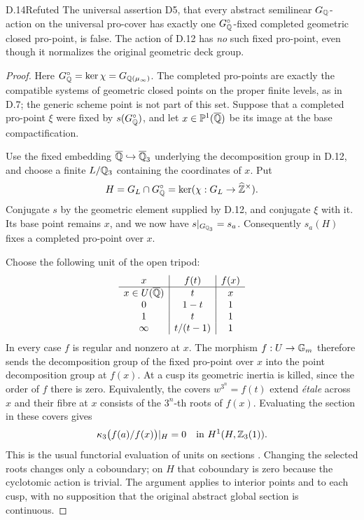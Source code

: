 \begin{claim}{D.14}{Refuted}
The universal assertion D5, that every abstract semilinear
$G_\mathbb Q$-action on the universal pro-cover has exactly one
$G_\mathbb Q^\circ$-fixed completed geometric closed pro-point,
is false. The action of D.12 has \emph{no} such fixed
pro-point, even though it normalizes the original geometric
deck group.
\end{claim}
\begin{proof}
Here $G_\mathbb Q^\circ=\ker\chi=G_{\mathbb Q(\mu_\infty)}$.
The completed pro-points are exactly the compatible systems
of geometric closed points on the proper finite levels,
as in D.7; the generic scheme point is not part of this
set. Suppose that a completed pro-point $\xi$ were fixed
by $s(G_\mathbb Q^\circ)$, and let
$x\in\mathbb P^1(\overline{\mathbb Q})$ be its image at the
base compactification.

Use the fixed embedding $\overline{\mathbb Q}\hookrightarrow
\overline{\mathbb Q}_3$ underlying the decomposition group in D.12,
and choose a finite $L/\mathbb Q_3$ containing the coordinates
of $x$. Put
\[
                 H=G_L\cap G_\mathbb Q^\circ
                      =\ker(\chi:G_L\to\widehat{\mathbb Z}^\times).
\]
Conjugate $s$ by the geometric element supplied by D.12,
and conjugate $\xi$ with it. Its base point remains $x$,
and we now have $s|_{G_{\mathbb Q_3}}=s_a$.
Consequently $s_a(H)$ fixes a completed pro-point over $x$.

Choose the following unit of the open tripod:
\[
\begin{array}{c|c|c}
 x&f(t)&f(x)\\\hline
 x\in U(\overline{\mathbb Q})&t&x\\
 0&1-t&1\\
 1&t&1\\
 \infty&t/(t-1)&1
\end{array}
\]
In every case $f$ is regular and nonzero at $x$.
The morphism $f:U\to\mathbb G_m$ therefore sends the decomposition
group of the fixed pro-point over $x$ into the point
decomposition group at $f(x)$. At a cusp its geometric
inertia is killed, since the order of $f$ there is zero.
Equivalently, the covers $w^{3^n}=f(t)$ extend
\emph{\'etale} across $x$ and their fibre at $x$ consists
of the $3^n$-th roots of $f(x)$. Evaluating the section
in these covers gives
\[
       \kappa_3\bigl(f(a)/f(x)\bigr)|_H=0
                         \quad\hbox{in }H^1(H,\mathbb Z_3(1)).
\]
This is the usual functorial evaluation of units on
sections \citep[Proposition~26 and \S8.3]{F_Stix2008}.
Changing the selected roots changes only a coboundary;
on $H$ that coboundary is zero because the cyclotomic
action is trivial. The argument applies to interior
points and to each cusp, with no supposition that the
original abstract global section is continuous.


\end{proof}
